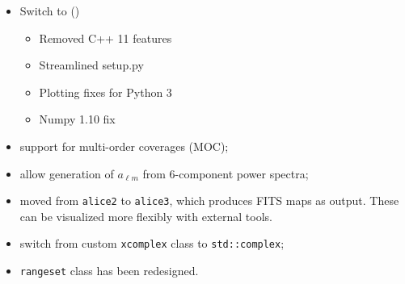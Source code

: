 \documentclass[12pt,twoside]{article}
\begin{document}
{{
	\begin{itemize}
	\item Switch to 
	()
	\begin{itemize}
	\item Removed C++ 11 features%
    	\item Streamlined setup.py%
    	\item Plotting fixes for Python 3%
    	\item Numpy 1.10 fix%
	\end{itemize}
	\end{itemize}



\begin{itemize}
\item support for multi-order coverages (MOC);
\item allow generation of $a_{\ell m}$ from 6-component power spectra;
\item moved from \texttt{alice2} to \texttt{alice3}, which produces FITS \healpix maps as output.
 These can be visualized more flexibly with external tools.
\item switch from custom \texttt{xcomplex} class to \texttt{std::complex};
\item \texttt{rangeset} class has been redesigned.
\end{itemize}


}}
\end{document}

